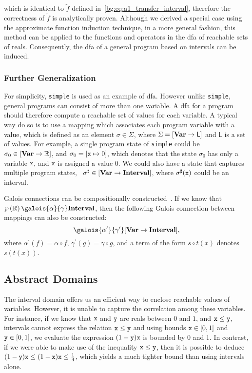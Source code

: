 which is identical to $\tilde{f}$ defined
in~\eqref{bg:eq:a1_transfer_interval}, therefore the correctness of $\tilde{f}$
is analytically proven.  Although we derived a special case using the
approximate function induction technique, in a more general fashion, this
method can be applied to the functions and operators in the \gls{dfa} of
reachable sets of reals.  Consequently, the \gls{dfa} of a general program
based on intervals can be induced.

\subsubsection{Further Generalization}

For simplicity, \verb|simple| is used as an example of \gls{dfa}\@.  However
unlike \verb|simple|, general programs can consist of more than one variable.
A \gls{dfa} for a program should therefore compute a reachable set of values
for each variable.  A typical way do so is to use a mapping which associates
each program variable with a value, which is defined as an element $\sigma \in
\Sigma$, where $\Sigma = \left[\mathbf{Var} \to \mathsf{L}\right]$ and $\mathsf{L}$
is a set of values.  For example, a single program state of \verb|simple|
could be $\sigma_0 \in \left[\mathbf{Var} \to \mathbb{R}\right]$, and $\sigma_0 =
[\texttt{x} \mapsto 0]$, which denotes that the state $\sigma_0$ has only a variable
$\texttt{x}$, and $\texttt{x}$ is assigned a value $0$.  We could also have a state that
captures multiple program states, \eg~$\sigma^\sharp \in \left[\mathbf{Var} \to
\mathbf{Interval}\right]$, where $\sigma^\sharp(\texttt{x})$ could be an interval.

Galois connections can be compositionally constructed~\cite{nielson99}.  If
we know that $\powersetof\realset \galois{\alpha}{\gamma} \intervalset$, then
the following Galois connection between mappings can also be constructed:
\begin{equation}
    [\varset \to \powersetof\realset]
        \galois{\alpha^\prime}{\gamma^\prime}
    [\varset \to \intervalset],
\end{equation}
where $\alpha^\prime(f) = \alpha \circ f$, $\gamma^\prime(g) = \gamma \circ g$,
and a term of the form $s \circ t (x)$ denotes $s(t(x))$.


\subsection{Abstract Domains}
\label{bg:sub:abstract_domains}

The interval domain offers us an efficient way to enclose reachable values
of variables.  However, it is unable to capture the correlation among these
variables.  For instance, if we know that $\texttt{x}$ and $\texttt{y}$ are reals between
$0$ and $1$, and $\texttt{x} \leq \texttt{y}$, intervals cannot express the relation
$\texttt{x} \leq \texttt{y}$ and using bounds $\texttt{x} \in [0, 1]$ and $\texttt{y} \in [0, 1]$,
we evaluate the expression $(1 - \texttt{y})\texttt{x}$ is bounded by $0$ and $1$.  In
contrast, if we were able to make use of the inequality $\texttt{x} \leq \texttt{y}$,
then it is possible to deduce $(1 - \texttt{y}) \texttt{x} \leq (1 - \texttt{x}) \texttt{x} \leq
\frac{1}{4}$, which yields a much tighter bound than using intervals alone.

